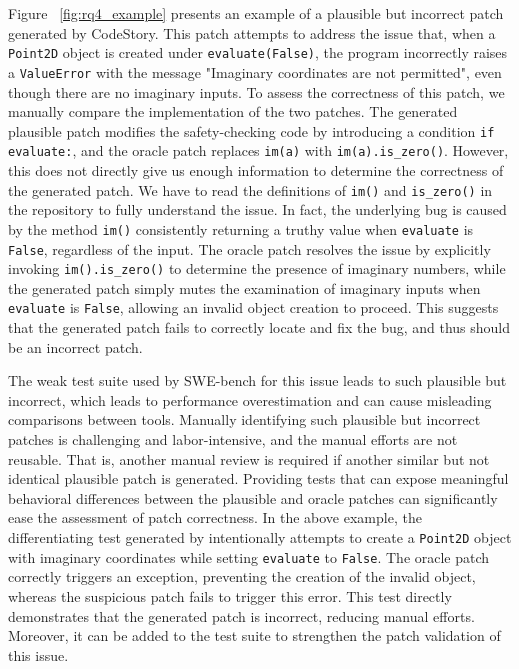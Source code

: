 Figure ~\ref{fig:rq4_example} presents an example of a plausible but incorrect patch generated by CodeStory.
This patch attempts to address the issue that, when a \verb|Point2D| object is created under \verb|evaluate(False)|, 
the program incorrectly raises a \verb|ValueError| with the message "Imaginary coordinates are not permitted", even though there are no imaginary inputs. 
To assess the correctness of this patch, we manually compare the implementation of the two patches. 
The generated plausible patch modifies the safety-checking code by introducing a condition \verb|if evaluate:|,  
and the oracle patch replaces \verb|im(a)| with \verb|im(a).is_zero()|. 
However, this does not directly give us enough information to determine the correctness of the generated patch. 
We have to read the definitions of \verb|im()| and \verb|is_zero()| in the repository to fully understand the issue. 
In fact, the underlying bug is caused by the method \verb|im()| consistently returning a truthy value when \verb|evaluate| is \verb|False|, regardless of the input. 
The oracle patch resolves the issue by explicitly invoking \verb|im().is_zero()| to determine the presence of imaginary numbers, 
while the generated patch simply mutes the examination of imaginary inputs when \verb|evaluate| is \verb|False|, 
allowing an invalid object creation to proceed. 
This suggests that the generated patch fails to correctly locate and fix the bug, and thus should be an incorrect patch. 

The weak test suite used by SWE-bench for this issue leads to such plausible but incorrect, which leads to performance overestimation and can cause misleading comparisons between tools.
Manually identifying such plausible but incorrect patches is challenging and labor-intensive, and the manual efforts are not reusable.
That is, another manual review is required if another similar but not identical plausible patch is generated.
Providing tests that can expose meaningful behavioral differences between the plausible and oracle patches can significantly ease the assessment of patch correctness.
In the above example, 
the differentiating test generated by \appname intentionally attempts to create a \verb|Point2D| object with imaginary coordinates while setting \verb|evaluate| to \verb|False|.
The oracle patch correctly triggers an exception, preventing the creation of the invalid object, 
whereas the suspicious patch fails to trigger this error.
This test directly demonstrates that the generated patch is incorrect, reducing manual efforts.
Moreover, it can be added to the test suite to strengthen the patch validation of this issue.













